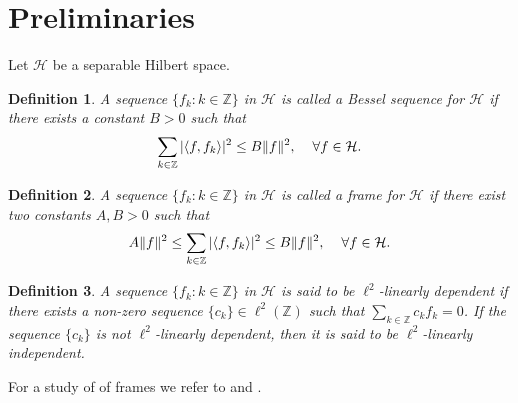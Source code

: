 \documentclass[a4paper,12pt,reqno]{amsart}
\theoremstyle{plain}
\numberwithin{equation}{section}
\newtheorem{defn}{Definition}[section]
\theoremstyle{definition}
\newcommand{\ds}{\displaystyle}
\begin{document}
\section{Preliminaries}
Let $\mathcal{H}$ be a separable Hilbert space.
\begin{defn}
A sequence $\{f_{k}:{k \in\mathbb {Z}}\}$ in $\mathcal{H}$ is called a Bessel sequence for $\mathcal{H}$ if there exists a constant $B > 0$ such that
\begin{eqnarray*}
\sum \limits_{k \in\mathbb {Z}}|\langle f,f_{k} \rangle |^{2}\leq B\|f\|^{2},\hspace{4mm}\forall f\in \mathcal{H}.
\end{eqnarray*}
\end{defn}
\begin{defn}
A sequence $\{f_{k}:{k \in\mathbb {Z}}\}$ in $\mathcal{H}$ is called a frame for $\mathcal{H}$ if there exist two constants $A,B > 0$ such that
\begin{eqnarray*}
A\|f\|^{2}\leq\ds\sum \limits_{k \in\mathbb {Z}}|\langle f,f_{k} \rangle |^{2}\leq B\|f\|^{2},\hspace{4mm}\forall f\in \mathcal{H}.
\end{eqnarray*}
\end{defn}
\begin{defn}
A sequence $\{f_{k}:{k \in\mathbb {Z}}\}$ in $\mathcal{H}$ is said to be $\ell^{2}$-linearly dependent if there exists a non-zero sequence $\{c_{k}\}\in\ell^{2}(\mathbb{Z})$ such that $\sum\limits_{k\in\mathbb{Z}}c_{k}f_{k}=0$.
If the sequence $\{c_{k}\}$ is not $\ell^{2}$-linearly dependent, then it is said to be  $\ell^{2}$-linearly independent.
\end{defn}
For a study of of frames we refer to \cite{chr2} and \cite{heil}.
\end{document}
